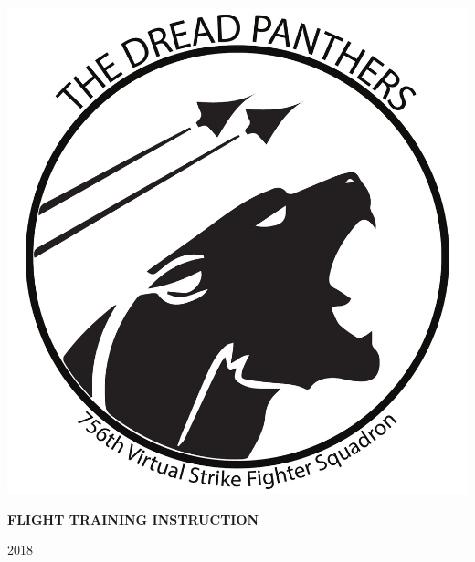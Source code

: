 \begin{titlepage}
\begin{center}
        \vspace{2cm}
        
        \includegraphics[scale=0.3]{765th.pdf}
        
        \vfill
        
        \huge
    	\textbf{FLIGHT TRAINING INSTRUCTION}
        
        \vfill
        
        \Large
        2018
        
	\end{center}
\end{titlepage}


